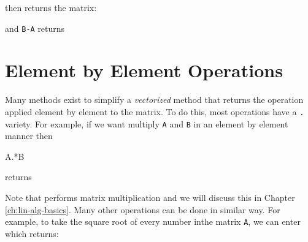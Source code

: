 then  returns the matrix:  \printpythontex[verbatim]

and \texttt{B-A} returns  \printpythontex[verbatim]

%
%
%
%
%

\section{Element by Element Operations}

Many methods exist to simplify a \emph{vectorized} method that returns
the operation applied element by element to the matrix. To do this, most
operations have a \texttt{.} variety.  For example, if we want multiply \verb!A! and \verb!B! in an element by element manner then 
\begin{jlblock}[array]
A.*B
\end{jlblock}
returns  \printpythontex[verbatim]

Note that  performs matrix multiplication and we will discuss this in Chapter \ref{ch:lin-alg-basics}.  Many other operations can be done in similar way.  For example, to take the square root of every number inthe matrix \texttt{A}, we can enter  which returns:  \printpythontex[verbatim]


